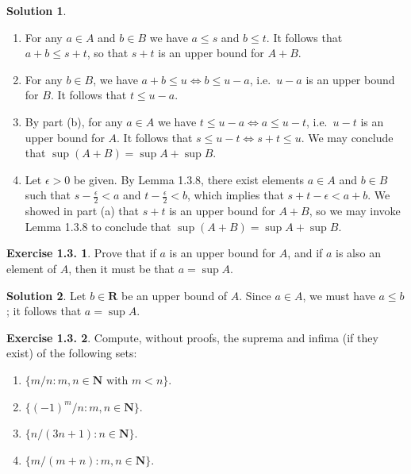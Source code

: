 \documentclass[12pt]{article}
\theoremstyle{definition}
\theoremstyle{exercise}
\newtheorem{exercise}{Exercise 1.3.}
\theoremstyle{solution}
\newtheorem*{solution}{Solution}
\newcommand{\R}{\mathbf{R}}
\begin{document}
\begin{solution}
    \begin{enumerate}
        \item For any \( a \in A \) and \( b \in B \) we have \( a \leq s \) and \( b \leq t \). It follows that \( a + b \leq s + t \), so that \( s + t \) is an upper bound for \( A + B \).

        \item For any \( b \in B \), we have \( a + b \leq u \iff b \leq u - a \), i.e.\ \( u - a \) is an upper bound for \( B \). It follows that \( t \leq u - a \).

        \item By part (b), for any \( a \in A \) we have \( t \leq u - a \iff a \leq u - t \), i.e.\ \( u - t \) is an upper bound for \( A \). It follows that \( s \leq u - t \iff s + t \leq u \). We may conclude that \( \sup(A + B) = \sup A + \sup B \).

        \item Let \( \epsilon > 0 \) be given. By Lemma 1.3.8, there exist elements \( a \in A \) and \( b \in B \) such that \( s - \tfrac{\epsilon}{2} < a \) and \( t - \tfrac{\epsilon}{2} < b \), which implies that \( s + t - \epsilon < a + b \). We showed in part (a) that \( s + t \) is an upper bound for \( A + B \), so we may invoke Lemma 1.3.8 to conclude that \( \sup(A + B) = \sup A + \sup B \).
    \end{enumerate}
\end{solution}

\begin{exercise}
\label{ex:7}
    Prove that if \( a \) is an upper bound for \( A \), and if \( a \) is also an element of \( A \), then it must be that \( a = \sup A \).
\end{exercise}

\begin{solution}
    Let \( b \in \R \) be an upper bound of \( A \). Since \( a \in A \), we must have \( a \leq b \); it follows that \( a = \sup A \).
\end{solution}

\begin{exercise}
\label{ex:8}
    Compute, without proofs, the suprema and infima (if they exist) of the following sets:
    \begin{enumerate}
        \item \( \{ m/n : m, n \in \mathbf{N} \text{ with } m < n \} \).

        \item \( \{ (-1)^m/n : m, n \in \mathbf{N} \} \).

        \item \( \{ n/(3n+1) : n \in \mathbf{N} \} \).

        \item \( \{ m/(m+n) : m, n \in \mathbf{N} \} \).
    \end{enumerate}
\end{exercise}
\end{document}
